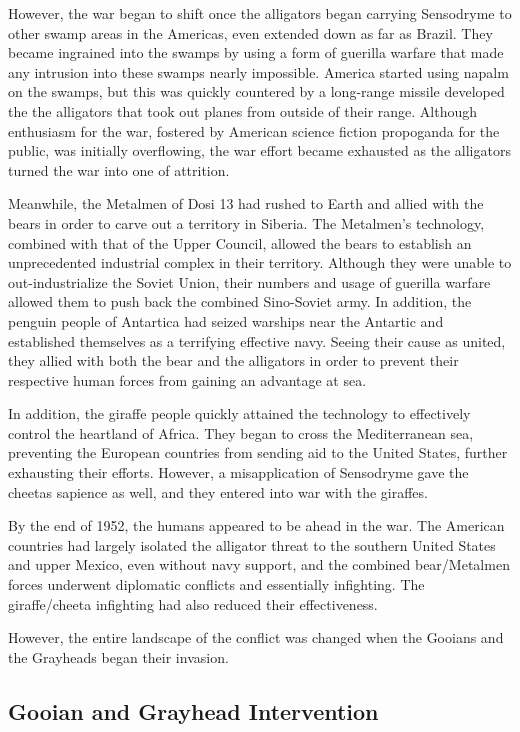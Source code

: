 \documentclass{article}
\begin{document}
However, the war began to shift once the alligators began carrying Sensodryme to other swamp areas in the Americas, even extended down as far as Brazil. They became ingrained into the swamps by using a form of guerilla warfare that made any intrusion into these swamps nearly impossible. America started using napalm on the swamps, but this was quickly countered by a long-range missile developed the the alligators that took out planes from outside of their range. Although enthusiasm for the war, fostered by American science fiction propoganda for the public, was initially overflowing, the war effort became exhausted as the alligators turned the war into one of attrition.

Meanwhile, the Metalmen of Dosi 13 had rushed to Earth and allied with the bears in order to carve out a territory in Siberia. The Metalmen's technology, combined with that of the Upper Council, allowed the bears to establish an unprecedented industrial complex in their territory. Although they were unable to out-industrialize the Soviet Union, their numbers and usage of guerilla warfare allowed them to push back the combined Sino-Soviet army. In addition, the penguin people of Antartica had seized warships near the Antartic and established themselves as a terrifying effective navy. Seeing their cause as united, they allied with both the bear and the alligators in order to prevent their respective human forces from gaining an advantage at sea.

In addition, the giraffe people quickly attained the technology to effectively control the heartland of Africa. They began to cross the Mediterranean sea, preventing the European countries from sending aid to the United States, further exhausting their efforts. However, a misapplication of Sensodryme gave the cheetas sapience as well, and they entered into war with the giraffes.

By the end of 1952, the humans appeared to be ahead in the war. The American countries had largely isolated the alligator threat to the southern United States and upper Mexico, even without navy support, and the combined bear/Metalmen forces underwent diplomatic conflicts and essentially infighting. The giraffe/cheeta infighting had also reduced their effectiveness.

However, the entire landscape of the conflict was changed when the Gooians and the Grayheads began their invasion.

\subsection{Gooian and Grayhead Intervention}
\end{document}
